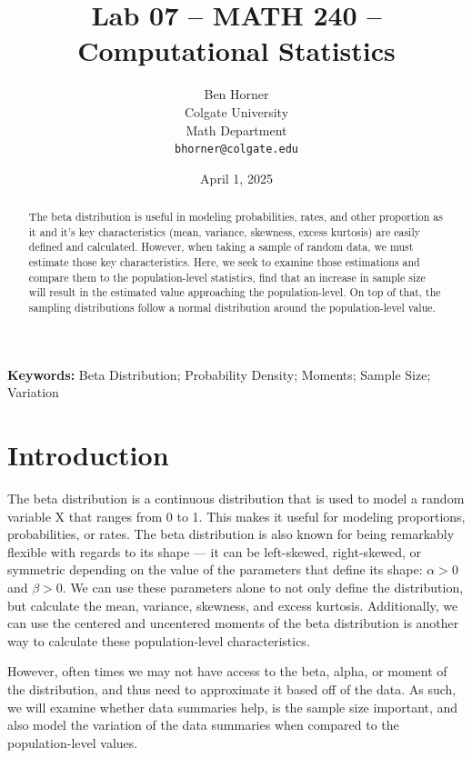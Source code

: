 \documentclass{article}\usepackage[]{graphicx}\usepackage[]{xcolor}
\begin{document}
\vspace{-1in}
\title{Lab 07 -- MATH 240 -- Computational Statistics}

\author{
  Ben Horner \\
  Colgate University  \\
  Math Department  \\
  {\tt bhorner@colgate.edu}
}

\date{April 1, 2025}

\maketitle

\begin{multicols}{2}
\begin{abstract}
The beta distribution is useful in modeling probabilities, rates, and other proportion as it and it's key characteristics (mean, variance, skewness, excess kurtosis) are easily defined and calculated. However, when taking a sample of random data, we must estimate those key characteristics. Here, we seek to examine those estimations and compare them to the population-level statistics, find that an increase in sample size will result in the estimated value approaching the population-level. On top of that, the sampling distributions follow a normal distribution around the population-level value.
\end{abstract}

\noindent \textbf{Keywords:} Beta Distribution; Probability Density; Moments; Sample Size; Variation

\section{Introduction}
The beta distribution is a continuous distribution that is used to model a random variable X that ranges from 0 to 1. This makes it useful for modeling proportions, probabilities, or rates. The beta distribution is also known for being remarkably flexible with regards to its shape --- it can be left-skewed, right-skewed, or symmetric depending on the value of the parameters that define its shape: $\alpha > 0$ and $\beta > 0$. We can use these parameters alone to not only define the distribution, but calculate the mean, variance, skewness, and excess kurtosis. Additionally, we can use the centered and uncentered moments of the beta distribution is another way to calculate these population-level characteristics.

However, often times we may not have access to the beta, alpha, or moment of the distribution, and thus need to approximate it based off of the data. As such, we will examine whether data summaries help, is the sample size important, and also model the variation of the data summaries when compared to the population-level values. 



\end{multicols}
\end{document}
